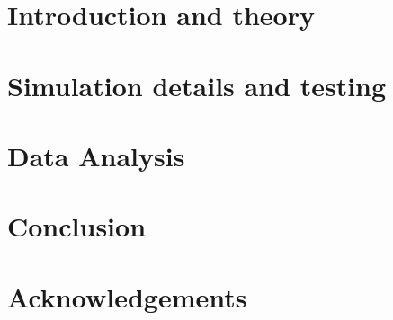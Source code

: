 \documentclass[a4paper, twoside, 11pt]{scrreprt}
\begin{document}
  

  \tableofcontents 
  \newpage

  \listoffigures
  \newpage

  \listoftables
  \newpage

  \null\thispagestyle{empty}  %
  \newpage


  \pagestyle{scrheadings} %
  \renewcommand{\chapterpagestyle}{plain} %



  \chapter{Introduction and theory}
    
  \newpage

  \chapter{Simulation details and testing}
    
  \newpage

  \null\thispagestyle{empty}  %
  \newpage

  \chapter{Data Analysis}
    
  \newpage

  

  \chapter{Conclusion}
    \pagestyle{plain} %
    \renewcommand{\chapterpagestyle}{plain} %
    
  \newpage

  \appendix
    
  \newpage

  \chapter*{Acknowledgements}
    
  \newpage

  \printbibliography

  \newpage
  \null\thispagestyle{empty}  %
\end{document}
